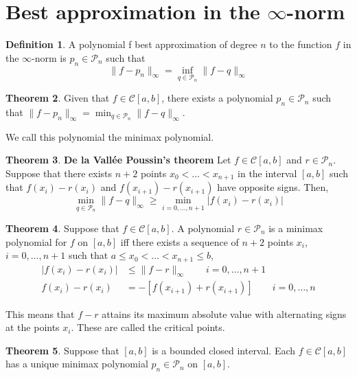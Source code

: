 \documentclass[12pt, openany]{report}
\theoremstyle{definition}
\newtheorem{thm}{Theorem}[chapter]
\newtheorem{definition}[thm]{Definition}
\begin{document}
\section{Best approximation in the \texorpdfstring{$\infty$}{infinity}-norm}
\begin{definition}
    A polynomial f best approximation of degree $n$ to the function $f$ in the $\infty$-norm is $p_n\in \mathcal{P}_n$ such that 
    \begin{equation}
        \lVert f-p_n\rVert_\infty = \inf_{q\in \mathcal{P}_n} \lVert f-q\rVert_\infty
    \end{equation}
\end{definition}
\begin{thm}
    Given that $f\in \mathcal{C}[a,b]$, there exists a polynomial $p_n\in \mathcal{P}_n$ such that $\lVert f-p_n\rVert_\infty = \min_{q\in \mathcal{P}_n} \lVert f-q\rVert_\infty$.
\end{thm}
We call this polynomial the minimax polynomial.
\begin{thm}\textbf{De la Vall\'ee Poussin's theorem}
    Let $f\in \mathcal{C}[a,b]$ and $r\in \mathcal{P}_n$. Suppose that there exists $n+2$ points $x_0<\dots<x_{n+1}$ in the interval $[a,b]$ such that $f(x_i)-r(x_i)$ and $f(x_{i+1})-r(x_{i+1})$ have opposite signs. Then,
    \begin{equation}
        \min_{q\in \mathcal{P}_n} \lVert f-q\rVert_\infty \ge \min_{i=0,\dots,n+1} |f(x_i)-r(x_i)|
    \end{equation}
\end{thm}
\begin{thm}
    Suppose that $f\in \mathcal{C}[a,b]$. A polynomial $r\in \mathcal{P}_n$ is a minimax polynomial for $f$ on $[a,b]$ iff there exists a sequence of $n+2$ points $x_i$, $i=0,\dots,n+1$ such that $a\le x_0<\dots<x_{n+1}\le b$, 
    \begin{equation}
        \begin{aligned}
            |f(x_i)-r(x_i)| &\le \lVert f-r\rVert_\infty \qquad i=0,\dots,n+1\\
            f(x_i)-r(x_i) &= - [f(x_{i+1})+r(x_{i+1})] \qquad i=0,\dots,n
        \end{aligned}
    \end{equation}
\end{thm}
This means that $f-r$ attains its maximum absolute value with alternating signs at the points $x_i$. These are called the critical points. 
\begin{thm}
    Suppose that $[a,b]$ is a bounded closed interval. Each $f\in \mathcal{C}[a,b]$ has a unique minimax polynomial $p_n\in \mathcal{P}_n$ on $[a,b]$. 
\end{thm}
\end{document}
